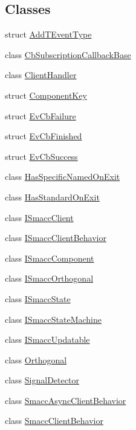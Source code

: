 \subsection*{Classes}
\begin{DoxyCompactItemize}
\item 
struct \hyperlink{structsmacc_1_1AddTEventType}{Add\+T\+Event\+Type}
\item 
class \hyperlink{classsmacc_1_1CbSubscriptionCallbackBase}{Cb\+Subscription\+Callback\+Base}
\item 
class \hyperlink{classsmacc_1_1ClientHandler}{Client\+Handler}
\item 
struct \hyperlink{structsmacc_1_1ComponentKey}{Component\+Key}
\item 
struct \hyperlink{structsmacc_1_1EvCbFailure}{Ev\+Cb\+Failure}
\item 
struct \hyperlink{structsmacc_1_1EvCbFinished}{Ev\+Cb\+Finished}
\item 
struct \hyperlink{structsmacc_1_1EvCbSuccess}{Ev\+Cb\+Success}
\item 
class \hyperlink{classsmacc_1_1HasSpecificNamedOnExit}{Has\+Specific\+Named\+On\+Exit}
\item 
class \hyperlink{classsmacc_1_1HasStandardOnExit}{Has\+Standard\+On\+Exit}
\item 
class \hyperlink{classsmacc_1_1ISmaccClient}{I\+Smacc\+Client}
\item 
class \hyperlink{classsmacc_1_1ISmaccClientBehavior}{I\+Smacc\+Client\+Behavior}
\item 
class \hyperlink{classsmacc_1_1ISmaccComponent}{I\+Smacc\+Component}
\item 
class \hyperlink{classsmacc_1_1ISmaccOrthogonal}{I\+Smacc\+Orthogonal}
\item 
class \hyperlink{classsmacc_1_1ISmaccState}{I\+Smacc\+State}
\item 
class \hyperlink{classsmacc_1_1ISmaccStateMachine}{I\+Smacc\+State\+Machine}
\item 
class \hyperlink{classsmacc_1_1ISmaccUpdatable}{I\+Smacc\+Updatable}
\item 
class \hyperlink{classsmacc_1_1Orthogonal}{Orthogonal}
\item 
class \hyperlink{classsmacc_1_1SignalDetector}{Signal\+Detector}
\item 
class \hyperlink{classsmacc_1_1SmaccAsyncClientBehavior}{Smacc\+Async\+Client\+Behavior}
\item 
class \hyperlink{classsmacc_1_1SmaccClientBehavior}{Smacc\+Client\+Behavior}

\end{DoxyCompactItemize}
